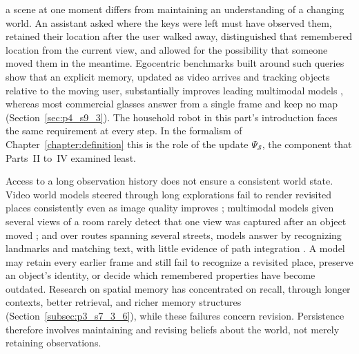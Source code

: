  a scene at one moment differs from maintaining an understanding of a changing world.
An assistant asked where the keys were left must have observed them, retained their location after the user walked away, distinguished that remembered location from the current view, and allowed for the possibility that someone moved them in the meantime.
Egocentric benchmarks built around such queries show that an explicit memory, updated as video arrives and tracking objects relative to the moving user, substantially improves leading multimodal models \cite{wang2026keepitinmind}, whereas most commercial glasses answer from a single frame and keep no map (Section~\ref{sec:p4_s9_3}).
The household robot in this part's introduction faces the same requirement at every step.
In the formalism of Chapter~\ref{chapter:definition} this is the role of the update $\Psi_{\mathcal{S}}$, the component that Parts~II to~IV examined least.

Access to a long observation history does not ensure a consistent world state.
Video world models steered through long explorations fail to render revisited places consistently even as image quality improves \cite{wang2026worldprobe}; multimodal models given several views of a room rarely detect that one view was captured after an object moved \cite{cao2026samespace}; and over routes spanning several streets, models answer by recognizing landmarks and matching text, with little evidence of path integration \cite{mahendran2026kilometervision}.
A model may retain every earlier frame and still fail to recognize a revisited place, preserve an object's identity, or decide which remembered properties have become outdated.
Research on spatial memory has concentrated on recall, through longer contexts, better retrieval, and richer memory structures (Section~\ref{subsec:p3_s7_3_6}), while these failures concern revision.
Persistence therefore involves maintaining and revising beliefs about the world, not merely retaining observations.

